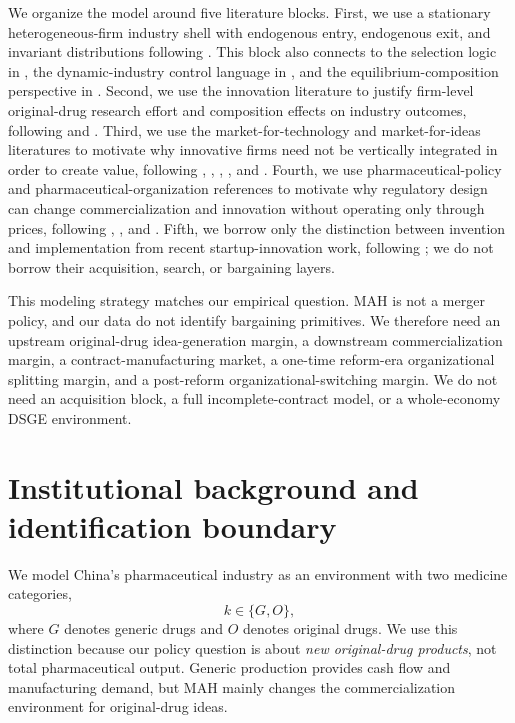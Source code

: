 \documentclass[12pt]{article}
\newcommand{\1}{\mathbf{1}}
\begin{document}
We organize the model around five literature blocks. First, we use a stationary heterogeneous-firm industry shell with endogenous entry, endogenous exit, and invariant distributions following \citet{Hopenhayn1992}. This block also connects to the selection logic in \citet{Jovanovic1982}, the dynamic-industry control language in \citet{EricsonPakes1995}, and the equilibrium-composition perspective in \citet{Luttmer2007}. Second, we use the innovation literature to justify firm-level original-drug research effort and composition effects on industry outcomes, following \citet{KletteKortum2004} and \citet{AkcigitKerr2018}. Third, we use the market-for-technology and market-for-ideas literatures to motivate why innovative firms need not be vertically integrated in order to create value, following \citet{AroraFosfuriGambardella2001}, \citet{AroraMerges2004}, \citet{GansStern2000}, \citet{GansStern2003}, and \citet{GansHsuStern2008}. Fourth, we use pharmaceutical-policy and pharmaceutical-organization references to motivate why regulatory design can change commercialization and innovation without operating only through prices, following \citet{Lakdawalla2018}, \citet{ChandraEtAl2026}, and \citet{JiaMaYangZhang2023}. Fifth, we borrow only the distinction between invention and implementation from recent startup-innovation work, following \citet{FonsRosenRoldanBlancoSchmitz2026}; we do not borrow their acquisition, search, or bargaining layers.

This modeling strategy matches our empirical question. MAH is not a merger policy, and our data do not identify bargaining primitives. We therefore need an upstream original-drug idea-generation margin, a downstream commercialization margin, a contract-manufacturing market, a one-time reform-era organizational splitting margin, and a post-reform organizational-switching margin. We do not need an acquisition block, a full incomplete-contract model, or a whole-economy DSGE environment.

\section{Institutional background and identification boundary}

We model China's pharmaceutical industry as an environment with two medicine categories,
\[
k \in \{G,O\},
\]
where $G$ denotes generic drugs and $O$ denotes original drugs. We use this distinction because our policy question is about \emph{new original-drug products}, not total pharmaceutical output. Generic production provides cash flow and manufacturing demand, but MAH mainly changes the commercialization environment for original-drug ideas.
\end{document}
